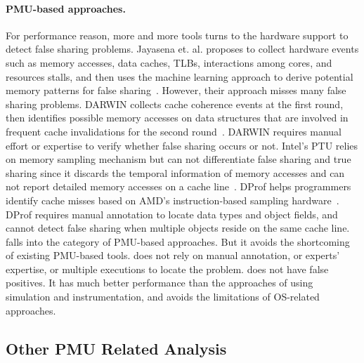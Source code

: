 \paragraph{PMU-based approaches.} For performance reason, more and more tools turns to the hardware support to detect false sharing problems. Jayasena et. al. proposes to collect hardware events such as memory accesses, data caches, TLBs, interactions among cores, and resources stalls, and then uses the machine learning approach to derive potential memory patterns for false sharing~\cite{mldetect}. However, their approach misses many false sharing problems. DARWIN collects cache coherence events at the first round, then identifies possible memory accesses on data structures that are involved in frequent cache invalidations for the second round~\cite{openmp}. DARWIN requires manual effort or expertise to verify whether false sharing occurs or not. Intel's PTU relies on memory sampling mechanism but can not differentiate false sharing and true sharing since it discards the temporal information of memory accesses and can not report detailed memory accesses on a cache line~\cite{detect:ptu}. DProf helps programmers identify cache misses based on AMD's instruction-based sampling hardware~\cite{DProf}. DProf requires manual annotation to locate data types and object fields, and cannot detect false sharing when multiple objects reside on the same cache line. \\

\cheetah{} falls into the category of PMU-based approaches. But it avoids the shortcoming of existing PMU-based tools. \cheetah{} does not rely on manual annotation, or experts' expertise, or multiple executions to locate the problem. \Cheetah{} does not have false positives. It has much better performance than the approaches of using simulation and instrumentation, and avoids the limitations of OS-related approaches. 


\subsection{Other PMU Related Analysis}

